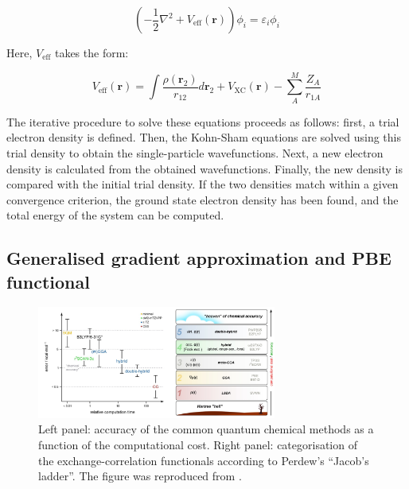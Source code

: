 \begin{equation}
    \left( -\frac{1}{2} \nabla^2 + V_{\text{eff}}(\mathbf{r}) \right) \phi_i = \varepsilon_i \phi_i
    \label{eq:ks_equations}
\end{equation}

Here, $V_{\text{eff}}$ takes the form:

\begin{equation}
    V_{\text{eff}}(\mathbf{r}) = \int \frac{\rho(\mathbf{r}_2)}{r_{12}} d\mathbf{r}_2 + V_{\text{XC}}(\mathbf{r}) - \sum_{A}^{M} \frac{Z_A}{r_{1A}}
    \label{eq:v_eff}
\end{equation}

The iterative procedure to solve these equations proceeds as follows: first, a trial electron density is defined. Then, the Kohn-Sham equations are solved using this trial density to obtain the single-particle wavefunctions. Next, a new electron density is calculated from the obtained wavefunctions. Finally, the new density is compared with the initial trial density. If the two densities match within a given convergence criterion, the ground state electron density has been found, and the total energy of the system can be computed.



\subsection{Generalised gradient approximation and PBE functional}

\begin{figure}[t!]
    \centering
    \includegraphics[width=0.7\textwidth]{Figures/2_Theory/theory_jacobs_ladder.png}
    \caption{Left panel: accuracy of the common quantum chemical methods as a function of the computational cost. Right panel: categorisation of the exchange-correlation functionals according to Perdew's ``Jacob's ladder''. The figure was reproduced from \citep{burschBestPracticeDFTProtocols2022}.}
    \label{fig:jacobs_ladder}
\end{figure}

